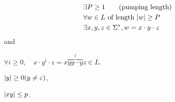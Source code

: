 \begin{definition}
    \begin{align*}
        &\exists P \ge 1 \qquad \text{(pumping length)} \\
        &\forall w \in L \text{ of length } { \left\lvert w \right\rvert } \ge P                \\
        &\exists x,y,z  \in \Sigma^*, w = x \cdot y \cdot z
    \end{align*}
    and
    \begin{compactitem}
    \item 
        $
        \forall i \geq 0, \quad
        x \cdot y^i \cdot z = x \overbrace{yy \cdots y}^i z \in L.
        $
    \item
        $
        { \left\lvert y \right\rvert } \ge 0 ( y \neq \varepsilon )
        $,
    \item
        $
        { \left\lvert xy \right\rvert } \le p
        $.
    \end{compactitem}
\end{definition}










